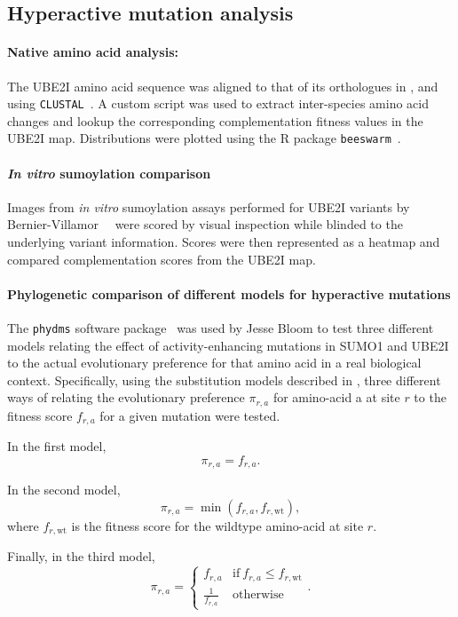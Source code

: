 \subsection{Hyperactive mutation analysis}
\paragraph{Native amino acid analysis:} The UBE2I amino acid sequence was aligned to that of its orthologues in ,  and  using \texttt{CLUSTAL}~\cite{russell_clustal_2014}. A custom script was used to extract inter-species amino acid changes and lookup the corresponding complementation fitness values in the UBE2I map. Distributions were plotted using the R package \texttt{beeswarm}~\cite{eklund_bee_2016}.

\paragraph{\textit{In vitro} sumoylation comparison} Images from \textit{in vitro} sumoylation assays performed for UBE2I variants by Bernier-Villamor~\etal~\cite{bernier-villamor_structural_2002} were scored by visual inspection while blinded to the underlying variant information. Scores were then represented as a heatmap and compared complementation scores from the UBE2I map.

\paragraph{Phylogenetic comparison of different models for hyperactive mutations}
The \texttt{phydms} software package~\cite{bloom_identification_2017} was used by Jesse Bloom to test three different models relating the effect of activity-enhancing mutations in SUMO1 and UBE2I to the actual evolutionary preference for that amino acid in a real biological context. Specifically, using the substitution models described in \cite{bloom_identification_2017}, three different ways of relating the evolutionary preference $\pi_{r,a}$ for amino-acid a at site $r$ to the fitness score $f_{r,a}$ for a given mutation were tested. 

In the first model, $$\pi_{r,a} = f_{r,a}.$$ 

In the second model, $$\pi_{r,a} = \min(f_{r,a}, f_{r,\text{wt}}),$$ where $f_{r,\text{wt}}$ is the fitness score for the wildtype amino-acid at site $r$. 

Finally, in the third model, $$\pi_{r,a} = \begin{cases} f_{r,a} &  \text{if}~ f_{r,a} \le f_{r,\text{wt}} \\ \frac{1}{f_{r,a}} & \text{otherwise} \end{cases}. $$ 

